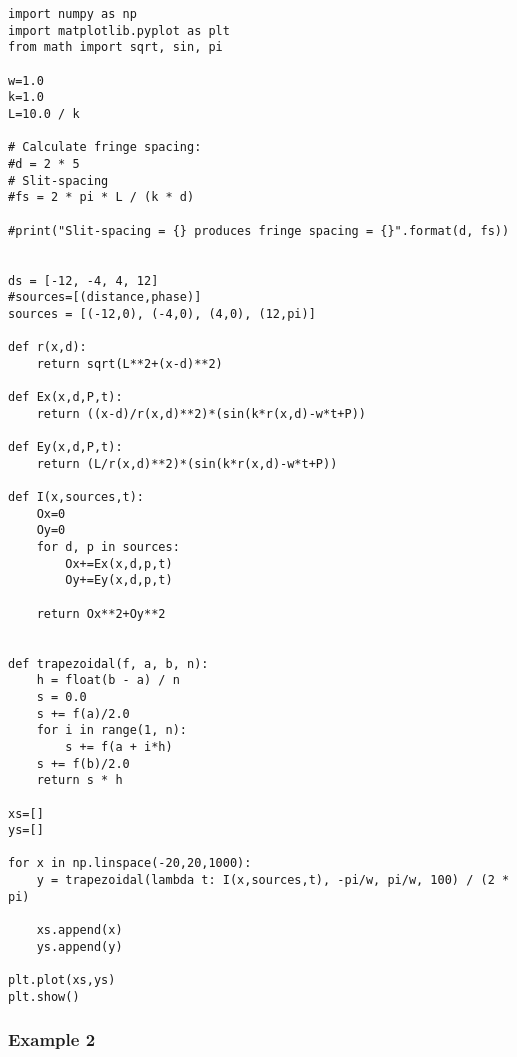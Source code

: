 \begin{Verbatim}[fontsize=\small,baselinestretch=0.9]
import numpy as np
import matplotlib.pyplot as plt
from math import sqrt, sin, pi

w=1.0
k=1.0
L=10.0 / k

# Calculate fringe spacing:
#d = 2 * 5           
# Slit-spacing
#fs = 2 * pi * L / (k * d)

#print("Slit-spacing = {} produces fringe spacing = {}".format(d, fs))


ds = [-12, -4, 4, 12]
#sources=[(distance,phase)]
sources = [(-12,0), (-4,0), (4,0), (12,pi)]

def r(x,d):
    return sqrt(L**2+(x-d)**2)
    
def Ex(x,d,P,t):
    return ((x-d)/r(x,d)**2)*(sin(k*r(x,d)-w*t+P))
   
def Ey(x,d,P,t):
    return (L/r(x,d)**2)*(sin(k*r(x,d)-w*t+P))
       
def I(x,sources,t):
    Ox=0
    Oy=0
    for d, p in sources:
        Ox+=Ex(x,d,p,t)
        Oy+=Ey(x,d,p,t)
    
    return Ox**2+Oy**2
        
    
def trapezoidal(f, a, b, n):
    h = float(b - a) / n
    s = 0.0
    s += f(a)/2.0
    for i in range(1, n):
        s += f(a + i*h)
    s += f(b)/2.0
    return s * h

xs=[]
ys=[]

for x in np.linspace(-20,20,1000):
    y = trapezoidal(lambda t: I(x,sources,t), -pi/w, pi/w, 100) / (2 * pi)
   
    xs.append(x)
    ys.append(y)

plt.plot(xs,ys)
plt.show()   
\end{Verbatim}


\subsubsection{Example 2}

